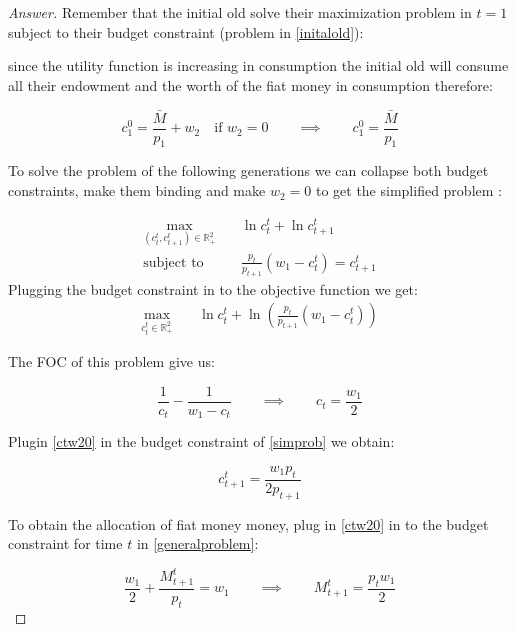 \documentclass{article}
\theoremstyle{definition}
\newcommand{\qiq}{\qquad \implies \qquad}
\begin{document}
\begin{proof}[Answer]
Remember that the initial old solve their maximization problem in $t=1$ subject to their budget constraint (problem in \eqref{initalold}):

since the utility function is increasing in consumption the initial old will consume all their endowment and the worth of the fiat money in consumption therefore:

\begin{equation}
c^0_1 = \frac{\bar{M}}{p_1}+w_2 \quad \text{if } w_2 = 0 \qiq \boxed{c^0_1 = \frac{\bar{M}}{p_1}}
\end{equation}

To solve the problem of the following generations we can collapse both budget constraints, make them binding and make $w_2=0$ to get the simplified problem :

\begin{align}\label{generalproblem}
\max_{(c^t_t,c^t_{t+1})\in \mathbb{R}_+^2 }&\quad \ln c^t_t + \ln c^t_{t+1} \\
\text{subject to} & \quad   \frac{p_t}{ p_{t+1}}(w_1 - c^t_t)= c^t_{t+1} \tag{BC}
\end{align}
Plugging the budget constraint in to the objective function we get:
\begin{align}\label{simprob}
\max_{c^t_t\in \mathbb{R}_+^2 }&\quad \ln c^t_t + \ln \left(\frac{p_t}{ p_{t+1}}(w_1 - c^t_t) \right)
\end{align}

The FOC of this problem give us:

\begin{equation}
\frac{1}{c_t}-\frac{1}{w_1-c_t} \qiq c_t = \frac{w_1}{2}\label{ctw20}
\end{equation}

Plugin \eqref{ctw20} in the budget constraint of \eqref{simprob} we obtain:

\begin{equation}\label{ct1w20}
   c^t_{t+1} = \frac{w_1 p_t}{2 p_{t+1}}
\end{equation}

To obtain the allocation of fiat money money, plug in \eqref{ctw20} in to the budget constraint for time $t$ in \eqref{generalproblem}:

\begin{equation}\label{Mw20}
\frac{w_1}{2} +  \frac{M_{t+1}^t}{p_t} = w_1 \qiq M^t_{t+1} = \frac{p_t w_1}{2}
\end{equation}


\end{proof}
\end{document}

